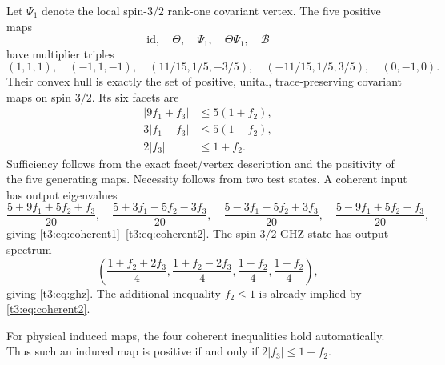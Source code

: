 \documentclass[11pt,a4paper]{article}
\begin{document}
Let $\Psi_1$ denote the local spin-$3/2$ rank-one covariant vertex.
The five positive maps
\[
 \mathrm{id},\quad\Theta,\quad\Psi_1,\quad\Theta\Psi_1,\quad\mathcal B
\]
have multiplier triples
\begin{equation}\label{t3:eq:positivevertices}
 (1,1,1),\quad(-1,1,-1),\quad
 (11/15,1/5,-3/5),\quad(-11/15,1/5,3/5),\quad(0,-1,0).
\end{equation}
Their convex hull is exactly the set of positive, unital,
trace-preserving covariant maps on spin $3/2$. Its six facets are
\begin{align}
 |9f_1+f_3|&\le5(1+f_2),\label{t3:eq:coherent1}\\
 3|f_1-f_3|&\le5(1-f_2),\label{t3:eq:coherent2}\\
 2|f_3|&\le1+f_2.\label{t3:eq:ghz}
\end{align}
Sufficiency follows from the exact facet/vertex description and the
positivity of the five generating maps. Necessity follows from two
test states. A coherent input has output eigenvalues
\[
 \frac{5+9f_1+5f_2+f_3}{20},\quad
 \frac{5+3f_1-5f_2-3f_3}{20},\quad
 \frac{5-3f_1-5f_2+3f_3}{20},\quad
 \frac{5-9f_1+5f_2-f_3}{20},
\]
giving \eqref{t3:eq:coherent1}--\eqref{t3:eq:coherent2}. The spin-$3/2$ GHZ
state has output spectrum
\[
 \left(\frac{1+f_2+2f_3}{4},\frac{1+f_2-2f_3}{4},
               \frac{1-f_2}{4},\frac{1-f_2}{4}\right),
\]
giving \eqref{t3:eq:ghz}. The additional inequality $f_2\le1$ is
already implied by \eqref{t3:eq:coherent2}.

For physical induced maps, the four coherent inequalities hold
automatically. Thus such an induced map is positive if and only if
$2|f_3|\le1+f_2$.
\end{document}
